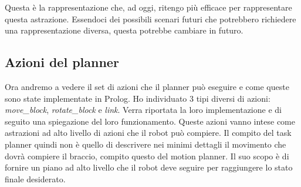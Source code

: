 Questa è la rappresentazione che, ad oggi, ritengo più efficace per rappresentare questa astrazione. Essendoci dei possibili scenari futuri che potrebbero richiedere una rappresentazione diversa, questa potrebbe cambiare in futuro.
\subsection{Azioni del planner}
\label{subsec:azioniplanner}
Ora andremo a vedere il set di azioni che il planner può eseguire e come queste sono state implementate in Prolog. Ho individuato 3 tipi diversi di azioni:
\textit{move\_block}, \textit{rotate\_block} e \textit{link}. Verra riportata la loro implementazione e di seguito una spiegazione del loro funzionamento.
Queste azioni vanno intese come astrazioni ad alto livello di azioni che il robot può compiere. Il compito del task planner quindi non è quello di descrivere nei minimi dettagli il movimento che dovrà compiere il braccio, compito questo del motion planner.
Il suo scopo è di fornire un piano ad alto livello che il robot deve seguire per raggiungere lo stato finale desiderato.

